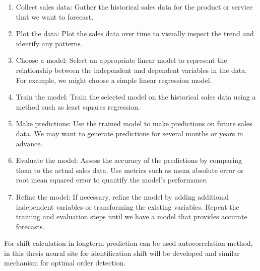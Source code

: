 \begin{enumerate}
    \item Collect sales data: Gather the historical sales data for the product or service that we want to forecast.
    \item Plot the data: Plot the sales data over time to visually inspect the trend and identify any patterns.
    \item Choose a model: Select an appropriate linear model to represent the relationship between the independent and
    dependent variables in the data. For example, we might choose a simple linear regression model.
    \item Train the model: Train the selected model on the historical sales data using a method such as least squares
    regression.
    \item Make predictions: Use the trained model to make predictions on future sales data. We may want to generate
    predictions for several months or years in advance.
    \item Evaluate the model: Assess the accuracy of the predictions by comparing them to the actual sales data.
    Use metrics such as mean absolute error or root mean squared error to quantify the model's performance.
    \item Refine the model: If necessary, refine the model by adding additional independent variables or
    transforming the existing variables. Repeat the training and evaluation steps until we have a model that
    provides accurate forecasts.
\end{enumerate}
For shift calculation in longterm prediction can be used autocorrelation method, in this thesis neural site for
identification shift will be developed and similar mechanism for optimal order detection.


